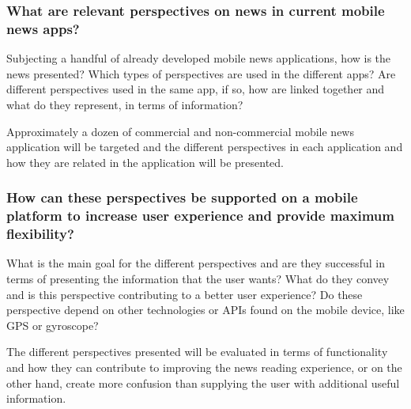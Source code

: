 

\subsubsection{What are relevant perspectives on news in current mobile news apps?}

Subjecting a handful of already developed mobile news applications, how is the news presented? Which types of perspectives are used in the different apps? Are different perspectives used in the same app, if so, how are linked together and what do they represent, in terms of information?

Approximately a dozen of commercial and non-commercial mobile news application will be targeted and the different perspectives in each application and how they are related in the application will be presented.




\subsubsection{How can these perspectives be supported on a mobile platform to increase user experience and provide maximum flexibility?}

What is the main goal for the different perspectives and are they successful in terms of presenting the information that the user wants? What do they convey and is this perspective contributing to a better user experience? Do these perspective depend on other technologies or APIs found on the mobile device, like GPS or gyroscope?

The different perspectives presented will be evaluated in terms of functionality and how they can contribute to improving the news reading experience, or on the other hand, create more confusion than supplying the user with additional useful information.


